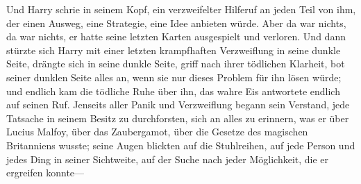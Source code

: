 Und Harry schrie in seinem Kopf, ein verzweifelter Hilferuf an jeden Teil von ihm, der einen Ausweg, eine Strategie, eine Idee anbieten würde.
Aber da war nichts, da war nichts, er hatte seine letzten Karten ausgespielt und verloren. Und dann stürzte sich Harry mit einer letzten krampfhaften Verzweiflung in seine dunkle Seite, drängte sich in seine dunkle Seite, griff nach ihrer tödlichen Klarheit, bot seiner dunklen Seite alles an, wenn sie nur dieses Problem für ihn lösen würde; und endlich kam die tödliche Ruhe über ihn, das wahre Eis antwortete endlich auf seinen Ruf. Jenseits aller Panik und Verzweiflung begann sein Verstand, jede Tatsache in seinem Besitz zu durchforsten, sich an alles zu erinnern, was er über Lucius Malfoy, über das Zaubergamot, über die Gesetze des magischen Britanniens wusste; seine Augen blickten auf die Stuhlreihen, auf jede Person und jedes Ding in seiner Sichtweite, auf der Suche nach jeder Möglichkeit, die er ergreifen konnte—

